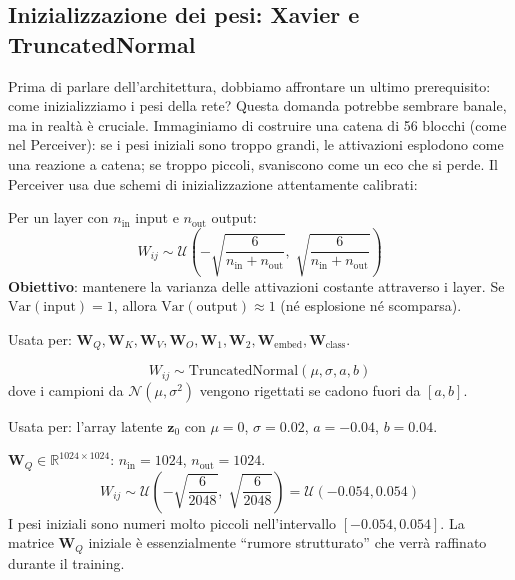 \documentclass[12pt,a4paper]{article}
\begin{document}
\subsection{Inizializzazione dei pesi: Xavier e TruncatedNormal} \label{sec:inizializzazione}

Prima di parlare dell'architettura, dobbiamo affrontare un ultimo prerequisito: come inizializziamo i pesi della rete? Questa domanda potrebbe sembrare banale, ma in realt\`a \`e cruciale. Immaginiamo di costruire una catena di 56 blocchi (come nel Perceiver): se i pesi iniziali sono troppo grandi, le attivazioni esplodono come una reazione a catena; se troppo piccoli, svaniscono come un eco che si perde. Il Perceiver usa due schemi di inizializzazione attentamente calibrati:

\begin{formulabox}[title={Xavier Uniform (Glorot \& Bengio, 2010)}]
Per un layer con $n_{\text{in}}$ input e $n_{\text{out}}$ output:
\[
    W_{ij} \sim \mathcal{U}\!\left(-\sqrt{\frac{6}{n_{\text{in}} + n_{\text{out}}}},\; \sqrt{\frac{6}{n_{\text{in}} + n_{\text{out}}}}\right)
\]
\textbf{Obiettivo}: mantenere la varianza delle attivazioni costante attraverso i layer. Se $\text{Var}(\text{input}) = 1$, allora $\text{Var}(\text{output}) \approx 1$ (n\'e esplosione n\'e scomparsa).

Usata per: $\mathbf{W}_Q, \mathbf{W}_K, \mathbf{W}_V, \mathbf{W}_O, \mathbf{W}_1, \mathbf{W}_2, \mathbf{W}_{\text{embed}}, \mathbf{W}_{\text{class}}$.
\end{formulabox}

\begin{formulabox}[TruncatedNormal]
\[
    W_{ij} \sim \text{TruncatedNormal}(\mu, \sigma, a, b)
\]
dove i campioni da $\mathcal{N}(\mu, \sigma^2)$ vengono rigettati se cadono fuori da $[a, b]$.

Usata per: l'array latente $\mathbf{z}_0$ con $\mu = 0$, $\sigma = 0.02$, $a = -0.04$, $b = 0.04$.
\end{formulabox}

\begin{examplebox}
$\mathbf{W}_Q \in \mathbb{R}^{1024 \times 1024}$: $n_{\text{in}} = 1024$, $n_{\text{out}} = 1024$.
\[
    W_{ij} \sim \mathcal{U}\!\left(-\sqrt{\frac{6}{2048}},\; \sqrt{\frac{6}{2048}}\right) = \mathcal{U}(-0.054, 0.054)
\]
I pesi iniziali sono numeri molto piccoli nell'intervallo $[-0.054, 0.054]$. La matrice $\mathbf{W}_Q$ iniziale \`e essenzialmente ``rumore strutturato'' che verr\`a raffinato durante il training.
\end{examplebox}
\end{document}
